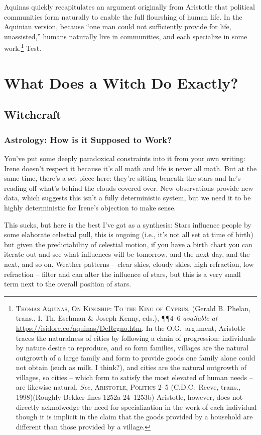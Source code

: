 \documentclass[../FGP.tex]{subfiles}
\begin{document}
Aquinas quickly recapitulates an argument originally from Aristotle that political communities form naturally to enable the full flourshing of human life. In the Aquinian version, because ``one man could not sufficiently provide for life, unassisted,'' humans naturally live in communities, and each specialize in some work.\footnote{%
  \textsc{Thomas Aquinas, On Kingship: To the King of Cyprus}, (Gerald B. Phelan, trans., I. Th. Eschman \& Joseph Kenny, eds.), \P\P4--6 \textit{available at} \url{https://isidore.co/aquinas/DeRegno.htm}. In the O.G.~argument, Aristotle traces the naturalness of cities by following a chain of progression: individuals by nature desire to reproduce, and so form families, villages are the natural outgrowth of a large family and form to provide goods one family alone could not obtain (such as milk, I think?), and cities are the natural outgrowth of villages, so cities -- which form to satisfy the most elevated of human needs -- are likewise natural. \textit{See,} \textsc{Aristotle, Politics} 2--5 (C.D.C.~Reeve, trans., 1998)(Roughly Bekker lines 1252a 24--1253b) Aristotle, however, does not directly acknolwedge the need for specialization in the work of each individual though it is implicit in the claim that the goods provided by a household are different than those provided by a village.} %
Test.



\section{What Does a Witch Do Exactly?}

\subsection{Witchcraft}
\subsubsection{Astrology: How is it Supposed to Work?}
You've put some deeply paradoxical constraints into it from your own writing: Irene doesn't respect it because it's all math and life is never all math. But at the same time, there's a set piece here: they're sitting beneath the stars and he's reading off what's behind the clouds covered over. New observations provide new data, which suggests this isn't a fully deterministic system, but we need it to be highly deterministic for Irene's objection to make sense. 

This sucks, but here is the best I've got as a synthesis: Stars influence people by some elaborate celestial pull, this is ongoing (i.e., it's not all set at time of birth) but given the predictability of celestial motion, if you have a birth chart you can iterate out and see what influences will be tomorrow, and the next day, and the next, and so on. Weather patterns -- clear skies, cloudy skies, high refraction, low refraction -- filter and can alter the influence of stars, but this is a very small term next to the overall position of stars.  
\end{document}
